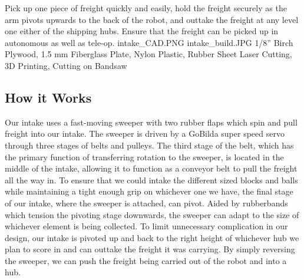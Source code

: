 {Pick up one piece of freight quickly and easily, hold the freight securely as the arm pivots upwards to the back of the robot, and outtake the freight at any level one either of the shipping hubs. Ensure that the freight can be picked up in autonomous as well as tele-op.
} %
{intake_CAD.PNG}%
{intake_build.JPG}%
{1/8” Birch Plywood, 1.5 mm Fiberglass Plate, Nylon Plastic, Rubber Sheet}%
{Laser Cutting, 3D Printing, Cutting on Bandsaw}%
\subsection*{How it Works}
Our intake uses a fast-moving sweeper with two rubber flaps which spin and pull freight into our intake. The sweeper is driven by a GoBilda super speed servo through three stages of belts and pulleys. The third stage of the belt, which has the primary function of transferring rotation to the sweeper, is located in the middle of the intake, allowing it to function as a conveyor belt to pull the freight all the way in. To ensure that we could intake the different sized blocks and balls while maintaining a tight enough grip on whichever one we have, the final stage of our intake, where the sweeper is attached, can pivot. Aided by rubberbands which tension the pivoting stage downwards, the sweeper can adapt to the size of whichever element is being collected.  To limit unnecessary complication in our design, our intake is pivoted up and back to the right height of whichever hub we plan to score in and can outtake the freight it was carrying. By simply reversing the sweeper, we can push the freight being carried out of the robot and into a hub.





